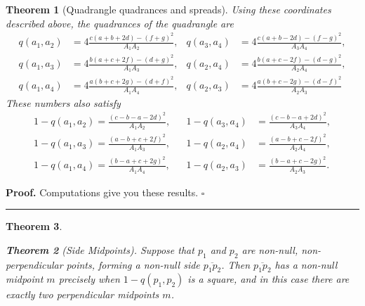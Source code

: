 \documentclass{unswthesis}
\newtheorem{theorem}{Theorem}
\newenvironment{proof}[1][Proof]{\noindent\textbf{#1.} }{\ \rule{0.5em}{0.5em}}
\begin{document}
\begin{theorem}[Quadrangle quadrances and spreads]
Using these coordinates described above, the quadrances of the quadrangle
are 
\begin{align*}
q(a_{1},a_{2})& =4\frac{c(a+b+2d)-(f+g)^{2}}{A_{1}A_{2}}, & q(a_{3},a_{4})&
=4\frac{c(a+b-2d)-(f-g)^{2}}{A_{3}A_{4}}, \\
q(a_{1},a_{3})& =4\frac{b(a+c+2f)-(d+g)^{2}}{A_{1}A_{3}}, & q(a_{2},a_{4})&
=4\frac{b(a+c-2f)-(d-g)^{2}}{A_{2}A_{4}}, \\
q(a_{1},a_{4})& =4\frac{a(b+c+2g)-(d+f)^{2}}{A_{1}A_{4}}, & q(a_{2},a_{3})&
=4\frac{a(b+c-2g)-(d-f)^{2}}{A_{2}A_{3}}
\end{align*}%
These numbers also satisfy 
\begin{align*}
1-q(a_{1},a_{2})=\frac{(c-b-a-2d)^{2}}{A_{1}A_{2}},& & 1-q(a_{3},a_{4})& =%
\frac{(c-b-a+2d)^{2}}{A_{3}A_{4}}, \\
1-q(a_{1},a_{3})=\frac{(a-b+c+2f)^{2}}{A_{1}A_{3}},& & 1-q(a_{2},a_{4})& =%
\frac{(a-b+c-2f)^{2}}{A_{2}A_{4}}, \\
1-q(a_{1},a_{4})=\frac{(b-a+c+2g)^{2}}{A_{1}A_{4}},& & 1-q(a_{2},a_{3})& =%
\frac{(b-a+c-2g)^{2}}{A_{2}A_{3}}.
\end{align*}
\end{theorem}

\begin{proof}
Computations give you these results. $\square $
\end{proof}

\begin{theorem}
\begin{theorem}[Side Midpoints]
Suppose that $p_{1}$ and $p_{2}$ are non-null, non-perpendicular points,
forming a non-null side $\overline{p_{1}p_{2}}$. Then $\overline{p_{1}p_{2}}$
has a non-null midpoint $m$ precisely when $1-q(p_{1},p_{2})$ is a square,
and in this case there are exactly two perpendicular midpoints $m$.
\end{theorem}
\end{theorem}
\end{document}

